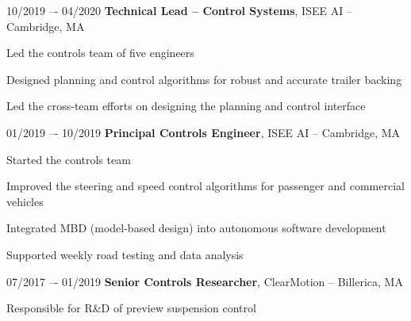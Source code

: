 \begin{twocolentry}{10/2019 –- 04/2020}
\textbf{Technical Lead – Control Systems}, ISEE AI -- Cambridge, MA\end{twocolentry}
\vspace{0.10 cm}
\begin{onecolentry}
    \begin{highlights}
        \item Led the controls team of five engineers
        \item Designed planning and control algorithms for robust and accurate trailer backing
        \item Led the cross-team efforts on designing the planning and control interface
    \end{highlights}
\end{onecolentry}
\vspace{0.25 cm}

\begin{twocolentry}{01/2019 –- 10/2019}
\textbf{Principal Controls Engineer}, ISEE AI -- Cambridge, MA\end{twocolentry}
\vspace{0.10 cm}
\begin{onecolentry}
    \begin{highlights}
        \item Started the controls team
        \item Improved the steering and speed control algorithms for passenger and commercial vehicles
        \item Integrated MBD (model-based design) into autonomous software development
        \item Supported weekly road testing and data analysis
    \end{highlights}
\end{onecolentry}
\vspace{0.25 cm}


\begin{twocolentry}{07/2017 –- 01/2019}
    \textbf{Senior Controls Researcher}, ClearMotion -- Billerica, MA\end{twocolentry}
\vspace{0.10 cm}
\begin{onecolentry}
    \begin{highlights}
\item Responsible for R\&D of preview suspension control
    \end{highlights}
\end{onecolentry}
\vspace{0.25 cm}


